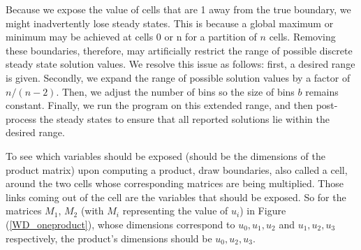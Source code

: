 \documentclass{article}
\begin{document}
Because we expose the value of cells that are 1 away from the true boundary, we might inadvertently lose steady states. This is because a global maximum or minimum may be achieved at cells 0 or n for a partition of $n$ cells. Removing these boundaries, therefore, may artificially restrict the range of possible discrete steady state solution values. We resolve this issue as follows: first, a desired range is given. Secondly, we expand the range of possible solution values by a factor of $n/(n-2)$. Then, we adjust the number of bins so the size of bins $b$ remains constant. Finally, we run the program on this extended range, and then post-process the steady states to ensure that all reported solutions lie within the desired range.

To see which variables should be exposed (should be the dimensions of the product matrix) upon computing a product, draw boundaries, also called a cell, around the two cells whose corresponding matrices are being multiplied. Those links coming out of the cell are the variables that should be exposed. So for the matrices $M_1$, $M_2$ (with $M_i$ representing the value of $u_i$) in Figure (\ref{WD_oneproduct}), whose dimensions correspond to $u_0, u_1, u_2$ and $u_1, u_2, u_3$ respectively, the product's dimensions should be $u_0, u_2, u_3$.


\begin{figure*}
\caption{Wiring diagram for a single product with 3 exposed variables and 4 total variables}
\label{WD_oneproduct}
\begin{center}
\end{center}
\end{figure*}
\end{document}

